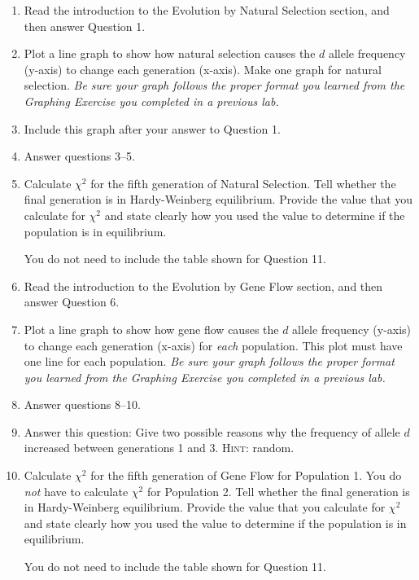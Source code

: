 \documentclass[12pt]{exam}
\begin{document}
\begin{enumerate}


\item Read the introduction to the Evolution by Natural Selection section, and then answer Question 1.

\item Plot a line graph to show how natural selection causes the $d$ allele frequency (y-axis) to change each generation (x-axis). Make one graph for natural selection. \emph{Be sure your graph follows the proper format you learned from the Graphing Exercise you completed in a previous lab.}

\item Include this graph after your answer to Question 1.

\item Answer questions 3–5.

\item Calculate $\chi^2$ for the fifth generation of Natural Selection. Tell whether the final generation is in Hardy-Weinberg equilibrium. Provide the value that you calculate for $\chi^2$ and state clearly how you used the value to determine if the population is in equilibrium.

You do not need to include the table shown for Question 11.

\item Read the introduction to the Evolution by Gene Flow section, and then answer Question 6.


\item Plot a line graph to show how gene flow causes the $d$ allele frequency (y-axis) to change each generation (x-axis) for \emph{each} population. This plot must have one line for each population. \emph{Be sure your graph follows the proper format you learned from the Graphing Exercise you completed in a previous lab.}


\item Answer questions 8–10.

\item Answer this question: Give two possible reasons why the frequency of allele $d$ increased between generations 1 and 3. \textsc{Hint:} random. 

\item Calculate $\chi^2$ for the fifth generation of Gene Flow for Population 1. You do \emph{not} have to calculate $\chi^2$ for Population 2. Tell whether the final generation is in Hardy-Weinberg equilibrium. Provide the value that you calculate for $\chi^2$ and state clearly how you used the value to determine if the population is in equilibrium.

You do not need to include the table shown for Question 11.

\end{enumerate}
\end{document}
